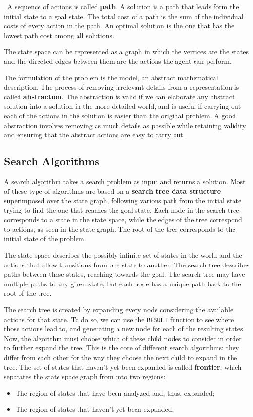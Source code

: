 \documentclass{article}
\begin{document}
\
A sequence of actions is called \textbf{path}. A solution is a path that leads form the initial state to a goal state. The total cost of a path is the sum of the individual costs of every action in the path. An optimal solution is the one that has the lowest path cost among all solutions.

The state space can be represented as a graph in which the vertices are the states and the directed edges between them are the actions the agent can perform. 

The formulation of the problem is the model, an abstract mathematical description. The process of removing irrelevant details from a representation is called \textbf{abstraction}. The abstraction is valid if we can elaborate any abstract solution into a solution in the more detailed world, and is useful if carrying out each of the actions in the solution is easier than the original problem. A good abstraction involves removing as much details as possible while retaining validity and ensuring that the abstract actions are easy to carry out.

\subsection{Search Algorithms}
A search algorithm takes a search problem as input and returns a solution. Most of these type of algorithms are based on a \textbf{search tree data structure} superimposed over the state graph, following various path from the initial state trying to find the one that reaches the goal state. Each node in the search tree corresponds to a state in the state space, while the edges of the tree correspond to actions, as seen in the state graph. The root of the tree corresponds to the initial state of the problem. 

The state space describes the possibly infinite set of states in the world and the actions that allow transitions from one state to another. The search tree describes paths between these states, reaching towards the goal. The search tree may have multiple paths to any given state, but each node has a unique path back to the root of the tree. 

The search tree is created by expanding every node considering the available actions for that state. To do so, we can use the \lstinline{RESULT} function to see where those actions lead to, and generating a new node for each of the resulting states. Now, the algorithm must choose which of these child nodes to consider in order to further expand the tree. This is the core of different search algorithms: they differ from each other for the way they choose the next child to expand in the tree. The set of states that haven't yet been expanded is called \textbf{frontier}, which separates the state space graph from into two regions:
\begin{itemize}
    \item The region of states that have been analyzed and, thus, expanded;
    \item The region of states that haven't yet been expanded.
\end{itemize}
\end{document}
